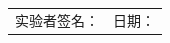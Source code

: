 \documentclass[UTF8,a4paper,zihao=-4]{ctexart}
\begin{document}
\vspace{2cm}

\begin{center}
    \renewcommand{\arraystretch}{2}
    \begin{tabular}{p{6cm}p{6cm}}
        实验者签名：\underline{\hspace{4cm}} & 日期：\underline{\hspace{4cm}} \\
    \end{tabular}
\end{center}
\end{document}
